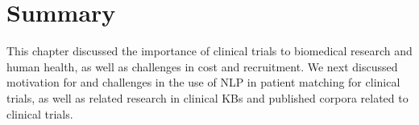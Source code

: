 \documentclass[../main.tex]{subfiles}
\begin{document}
\section{Summary}

This chapter discussed the importance of clinical trials to biomedical research and human health, as well as challenges in cost and recruitment. We next discussed motivation for and challenges in the use of NLP in patient matching for clinical trials, as well as related research in clinical KBs and published corpora related to clinical trials.
\end{document}
